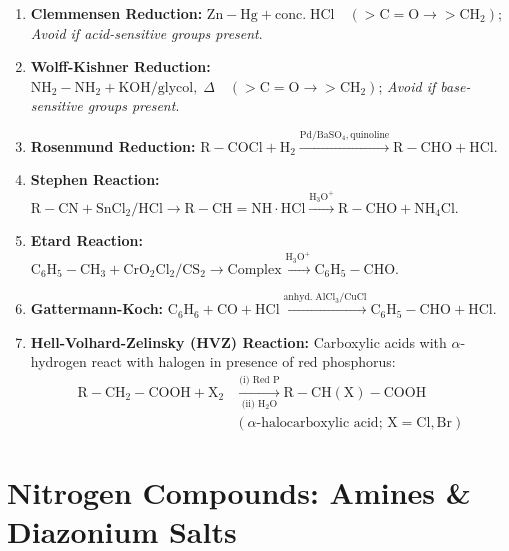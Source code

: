 \documentclass[10pt,twoside,openright]{book}
\begin{document}
\begin{formulabox}
\begin{enumerate}[leftmargin=*]
  \item \textbf{Clemmensen Reduction:} $\mathrm{Zn-Hg} + \mathrm{conc.\; HCl} \quad (\mathrm{>C=O} \to \mathrm{>CH_2})$; \textit{Avoid if acid-sensitive groups present}.
  \item \textbf{Wolff-Kishner Reduction:} $\mathrm{NH_2-NH_2} + \mathrm{KOH} / \text{glycol},\; \Delta \quad (\mathrm{>C=O} \to \mathrm{>CH_2})$; \textit{Avoid if base-sensitive groups present}.
  \item \textbf{Rosenmund Reduction:} $\mathrm{R-COCl} + \mathrm{H_2} \xrightarrow{\mathrm{Pd / BaSO_4, quinoline}} \mathrm{R-CHO} + \mathrm{HCl}$.
  \item \textbf{Stephen Reaction:} $\mathrm{R-CN} + \mathrm{SnCl_2 / HCl} \to \mathrm{R-CH=NH\cdot HCl} \xrightarrow{\mathrm{H_3O^+}} \mathrm{R-CHO} + \mathrm{NH_4Cl}$.
  \item \textbf{Etard Reaction:} $\mathrm{C_6H_5-CH_3} + \mathrm{CrO_2Cl_2 / CS_2} \to \text{Complex} \xrightarrow{\mathrm{H_3O^+}} \mathrm{C_6H_5-CHO}$.
  \item \textbf{Gattermann-Koch:} $\mathrm{C_6H_6} + \mathrm{CO} + \mathrm{HCl} \xrightarrow{\mathrm{anhyd.\; AlCl_3 / CuCl}} \mathrm{C_6H_5-CHO} + \mathrm{HCl}$.
  \item \textbf{Hell-Volhard-Zelinsky (HVZ) Reaction:}
  Carboxylic acids with $\alpha$-hydrogen react with halogen in presence of red phosphorus:
  \begin{align}
    \mathrm{R-CH_2-COOH} + \mathrm{X_2} &\xrightarrow[\text{(ii) } \mathrm{H_2O}]{\text{(i) Red P}} \mathrm{R-CH(X)-COOH} \nonumber\\
    &(\alpha\text{-halocarboxylic acid; } \mathrm{X = Cl, Br})
  \end{align}
\end{enumerate}
\end{formulabox}

\section{Nitrogen Compounds: Amines \& Diazonium Salts}
\end{document}
